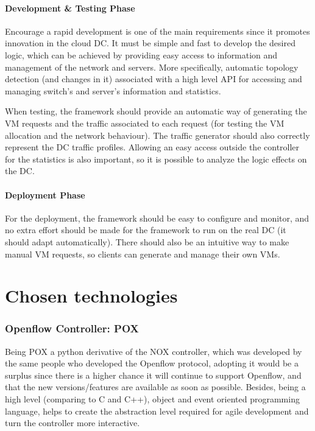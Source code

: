 \documentclass[12pt,english,oneside]{book}
\begin{document}
\paragraph{Development \& Testing Phase}
\hspace{0.6cm}

Encourage a rapid development is one of the main requirements since it promotes innovation in the cloud DC.
It must be simple and fast to develop the desired logic, which can be achieved by providing easy access to information and management of the network and servers.
More specifically, automatic topology detection (and changes in it) associated with a high level API for accessing and managing switch's and server's information and statistics.

When testing, the framework should provide an automatic way of generating the VM requests and the traffic associated to each request (for testing the VM allocation and the network behaviour).
The traffic generator should also correctly represent the DC traffic profiles.
Allowing an easy access outside the controller for the statistics is also important, so it is possible to analyze the logic effects on the DC.

\paragraph{Deployment Phase}
\hspace{0.6cm}

For the deployment, the framework should be easy to configure and monitor, and no extra effort should be made for the framework to run on the real DC (it should adapt automatically). There should also be an intuitive way to make manual VM requests, so clients can generate and manage their own VMs.

\section{Chosen technologies}

\subsubsection{Openflow Controller: POX}
\hspace{0.6cm}

Being POX a python derivative of the NOX controller, which was developed by the same people who developed the Openflow protocol, adopting it would be a surplus since there is a higher chance it will continue to support Openflow, and that the new versions/features are available as soon as possible.
Besides, being a high level (comparing to C and C++), object and event oriented programming language, helps to create the abstraction level required for agile development and turn the controller more interactive.
\end{document}

